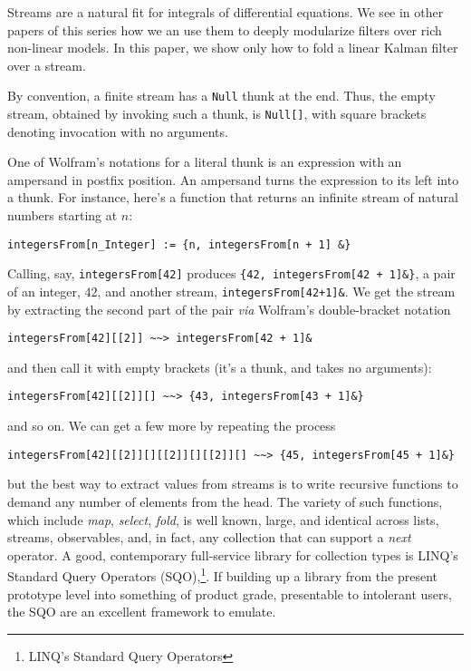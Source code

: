 \documentclass[10pt,oneside,x11names]{article}
\begin{document}
Streams are a natural fit for integrals of differential equations. We see in
other papers of this series how we an use them to deeply modularize filters
over rich non-linear models. In this paper, we show only how to fold a linear
Kalman filter over a stream.

By convention, a finite stream has a \texttt{Null} thunk at the end. Thus, the empty
stream, obtained by invoking such a thunk, is \texttt{Null[]}, with square brackets
denoting invocation with no arguments.

One of Wolfram's notations for a literal thunk is an expression with an
ampersand in postfix position. An ampersand turns the expression to its left
into a thunk. For instance, here's a function that returns an infinite stream of
natural numbers starting at \(n\):

\begin{verbatim}
integersFrom[n_Integer] := {n, integersFrom[n + 1] &}
\end{verbatim}

Calling, say, \texttt{integersFrom[42]} produces \texttt{\{42, integersFrom[42 + 1]\&\}}, a pair
of an integer, \(42\), and another stream, \texttt{integersFrom[42+1]\&}. We get the
stream by extracting the second part of the pair \emph{via} Wolfram's double-bracket notation

\begin{verbatim}
integersFrom[42][[2]] ~~> integersFrom[42 + 1]&
\end{verbatim}

\noindent and then call it with empty brackets (it's a thunk, and takes no
arguments):

\begin{verbatim}
integersFrom[42][[2]][] ~~> {43, integersFrom[43 + 1]&}
\end{verbatim}

\noindent and so on. We can get a few more by repeating the process

\begin{verbatim}
integersFrom[42][[2]][][[2]][][[2]][] ~~> {45, integersFrom[45 + 1]&}
\end{verbatim}

\noindent but the best way to extract values from streams is to write recursive
functions to demand any number of elements from the head. The variety of such
functions, which include \emph{map}, \emph{select}, \emph{fold}, is well known, large, and
identical across lists, streams, observables, and, in fact, any collection that
can support a \emph{next} operator. A good, contemporary full-service library for
collection types is LINQ's Standard Query Operators (SQO),\footnote{LINQ's Standard Query Operators}. If building
up a library from the present prototype level into something of product grade,
presentable to intolerant users, the SQO are an excellent framework to emulate.
\end{document}
